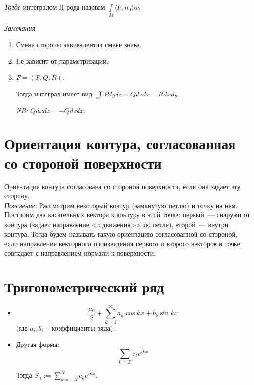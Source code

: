 \documentclass[paper=a4, fontsize=17pt]{article}
\begin{document}
	\emph{Тогда} интегралом II рода назовем $\int\limits_{M} \langle F, n_0 \rangle ds$

	\emph{Замечания}
	\begin{enumerate}
		\item Смена стороны эквивалентна смене знака.
		\item Не зависит от параметризации.
		\item
		$F=(P, Q, R)$.

		Тогда интеграл имеет вид $\iint P dydz + Q dzdx + R dxdy$.

		\emph{NB:} $Q dxdz = -Q dzdx$.
	\end{enumerate}

	\section{Ориентация контура, согласованная со стороной поверхности}

	Ориентация контура согласована со стороной поверхности, если она задает эту сторону.\\

	\emph{Пояснение}:
	Рассмотрим некоторый контур (замкнутую петлю) и точку на нем. Построим два касательных вектора к контуру в этой точке: первый~--- снаружи от контура (задает направление <<движения>> по петле), второй~--- внутри контура. Тогда будем называть такую ориентацию согласованной со стороной, если направление векторного произведения первого и второго векторов в точке совпадает с направлением нормали к поверхности.

	\begin{center}
	\end{center}

	\section{Тригонометрический ряд}

	\begin{itemize}
		\item $$ \frac{a_0}{2}  + \sum_{k = 1}^{\infty} a_k\cos kx + b_k\sin kx $$
		(где $ a_i, b_i $ -- коэффициенты ряда).

		\item Другая форма:	$$ \sum_{k = \mathbb{Z}} c_k e^{ikx} $$

		Тогда $ S_n := \sum_{k = -N}^{N} c_k e^{ikx} $.
	\end{itemize}
\end{document}
